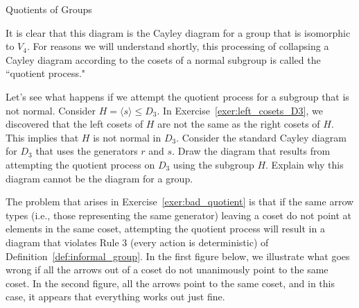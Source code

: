 \begin{section}{Quotients of Groups}
\begin{center}
\end{center}
It is clear that this diagram is the Cayley diagram for a group that is isomorphic to $V_4$.  For reasons we will understand shortly, this processing of collapsing a Cayley diagram according to the cosets of a normal subgroup is called the ``quotient process."

\begin{exercise}\label{exer:bad_quotient}
Let's see what happens if we attempt the quotient process for a subgroup that is not normal.  Consider $H=\langle s\rangle \leq D_3$.  In Exercise~\ref{exer:left_cosets_D3}, we discovered that the left cosets of $H$ are not the same as the right cosets of $H$.  This implies that $H$ is not normal in $D_3$.  Consider the standard Cayley diagram for $D_3$ that uses the generators $r$ and $s$.  Draw the diagram that results from attempting the quotient process on $D_3$ using the subgroup $H$.  Explain why this diagram cannot be the diagram for a group.
\end{exercise}

The problem that arises in Exercise~\ref{exer:bad_quotient} is that if the same arrow types (i.e., those representing the same generator) leaving a coset do not point at elements in the same coset, attempting the quotient process will result in a diagram that violates Rule 3 (every action is deterministic) of Definition~\ref{def:informal_group}.  In the first figure below, we illustrate what goes wrong if all the arrows out of a coset do not unanimously point to the same coset.  In the second figure, all the arrows point to the same coset, and in this case, it appears that everything works out just fine.


\end{section}
